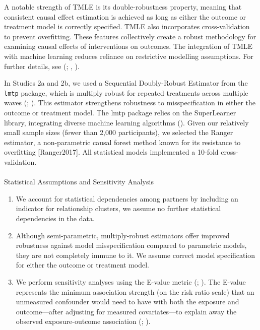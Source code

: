 \documentclass[
  singlecolumn]{article}
\makeatletter
\let\oldparagraph\paragraph
\renewcommand{\paragraph}{
    \@ifstar
      \xxxParagraphStar
      \xxxParagraphNoStar
  }
\newcommand{\xxxParagraphStar}[1]{\oldparagraph*{#1}\mbox{}}
\newcommand{\xxxParagraphNoStar}[1]{\oldparagraph{#1}\mbox{}}
\providecommand{\tightlist}{%
  \setlength{\itemsep}{0pt}\setlength{\parskip}{0pt}}\usepackage{longtable,booktabs,array}
\makeatother
\begin{document}
A notable strength of TMLE is its double-robustness property, meaning
that consistent causal effect estimation is achieved as long as either
the outcome or treatment model is correctly specified. TMLE also
incorporates cross-validation to prevent overfitting. These features
collectively create a robust methodology for examining causal effects of
interventions on outcomes. The integration of TMLE with machine learning
reduces reliance on restrictive modelling assumptions. For further
details, see (;
,
).

In Studies 2a and 2b, we used a Sequential Doubly-Robust Estimator from
the \texttt{lmtp} package, which is multiply robust for repeated
treatments across multiple waves (; ). This estimator strengthens robustness to misspecification in
either the outcome or treatment model. The lmtp package relies on the
SuperLearner library, integrating diverse machine learning algorithms
(). Given our
relatively small sample sizes (fewer than 2,000 participants), we
selected the Ranger estimator, a non-parametric causal forest method
known for its resistance to overfitting {[}Ranger2017{]}. All
statistical models implemented a 10-fold cross-validation.

\paragraph{Statistical Assumptions and Sensitivity
Analysis}\label{statistical-assumptions-and-sensitivity-analysis}

\begin{enumerate}
\def\labelenumi{\arabic{enumi}.}
\tightlist
\item
  We account for statistical dependencies among partners by including an
  indicator for relationship clusters, we assume no further statistical
  dependencies in the data.
\item
  Although semi-parametric, multiply-robust estimators offer improved
  robustness against model misspecification compared to parametric
  models, they are not completely immune to it. We assume correct model
  specification for either the outcome or treatment model.
\item
  We perform sensitivity analyses using the E-value metric
  (;
  ). The
  E-value represents the minimum association strength (on the risk ratio
  scale) that an unmeasured confounder would need to have with both the
  exposure and outcome---after adjusting for measured covariates---to
  explain away the observed exposure-outcome association
  (;
  ).
\end{enumerate}
\end{document}
